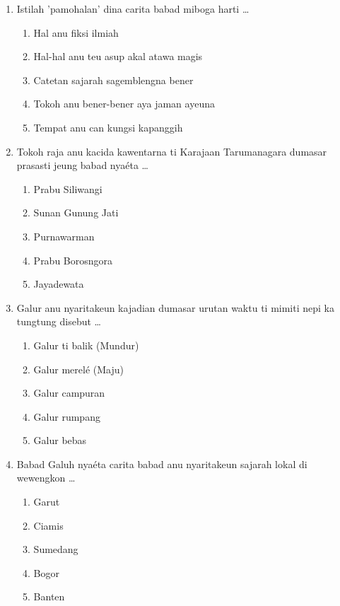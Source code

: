 \documentclass[12pt,a4paper]{article}
\begin{document}
\begin{enumerate}[leftmargin=*]
\item Istilah 'pamohalan' dina carita babad miboga harti \dots
    \begin{enumerate}[label=\alph*.]
        \item Hal anu fiksi ilmiah
        \item Hal-hal anu teu asup akal atawa magis
        \item Catetan sajarah sagemblengna bener
        \item Tokoh anu bener-bener aya jaman ayeuna
        \item Tempat anu can kungsi kapanggih
    \end{enumerate}

\item Tokoh raja anu kacida kawentarna ti Karajaan Tarumanagara dumasar prasasti jeung babad nyaéta \dots
    \begin{enumerate}[label=\alph*.]
        \item Prabu Siliwangi
        \item Sunan Gunung Jati
        \item Purnawarman
        \item Prabu Borosngora
        \item Jayadewata
    \end{enumerate}

\item Galur anu nyaritakeun kajadian dumasar urutan waktu ti mimiti nepi ka tungtung disebut \dots
    \begin{enumerate}[label=\alph*.]
        \item Galur ti balik (Mundur)
        \item Galur merelé (Maju)
        \item Galur campuran
        \item Galur rumpang
        \item Galur bebas
    \end{enumerate}

\item Babad Galuh nyaéta carita babad anu nyaritakeun sajarah lokal di wewengkon \dots
    \begin{enumerate}[label=\alph*.]
        \item Garut
        \item Ciamis
        \item Sumedang
        \item Bogor
        \item Banten
    \end{enumerate}


\end{enumerate}
\end{document}
